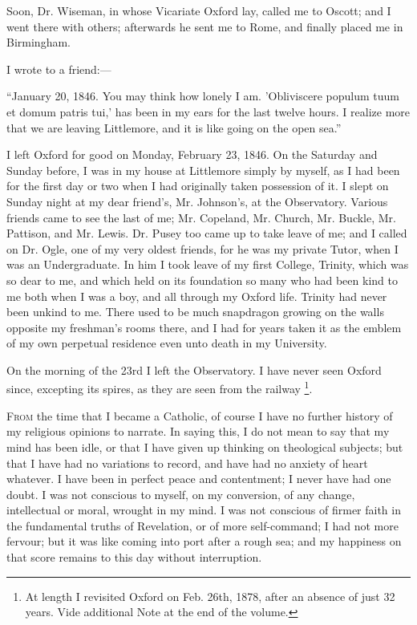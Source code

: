 Soon, Dr. Wiseman, in whose Vicariate Oxford lay, called me to Oscott;
and I went there with others; afterwards he sent me to Rome, and finally
placed me in Birmingham.

I wrote to a friend:—

``January 20, 1846. You may think how lonely I am. 'Obliviscere
populum tuum et domum patris tui,' has been in my ears for the last
twelve hours. I realize more that we are leaving Littlemore, and it is
like going on the open sea.''

I left Oxford for good on Monday, February 23, 1846. On the Saturday
and Sunday before, I was in my house at Littlemore simply by myself, as
I had been for the first day or two when I had originally taken
possession of it. I slept on Sunday night at my dear friend's, Mr.
Johnson's, at the Observatory. Various friends came to see the last of
me; Mr. Copeland, Mr. Church, Mr. Buckle, Mr. Pattison, and Mr. Lewis.
Dr. Pusey too came up to take leave of me; and I called on Dr. Ogle, one
of my very oldest friends, for he was my private Tutor, when I was an
Undergraduate. In him I took leave of my first College, Trinity, which
was so dear to me, and which held on its foundation so many who had been kind to me both when I was a boy, and all through my
Oxford life. Trinity had never been unkind to me. There used to be much
snapdragon growing on the walls opposite my freshman's rooms there, and
I had for years taken it as the emblem of my own perpetual residence
even unto death in my University.

On the morning of the 23rd I left the Observatory. I have never seen
Oxford since, excepting its spires, as they are seen from the railway \footnote{At length I revisited Oxford on Feb. 26th, 1878, after
an absence of just 32 years. Vide additional Note at the end of the
volume.}.


F\textsc{rom} the time that I became a Catholic, of course I
have no further history of my religious opinions to narrate. In saying
this, I do not mean to say that my mind has been idle, or that I have
given up thinking on theological subjects; but that I have had no
variations to record, and have had no anxiety of heart whatever. I
have been in perfect peace and contentment; I never have had one doubt.
I was not conscious to myself, on my conversion, of any change, intellectual or moral, wrought in
my mind. I
was not conscious of firmer faith in the fundamental truths of
Revelation, or of more self-command; I had not more fervour;
but it was like coming into port after a rough sea; and my happiness on
that score remains to this day without interruption.

